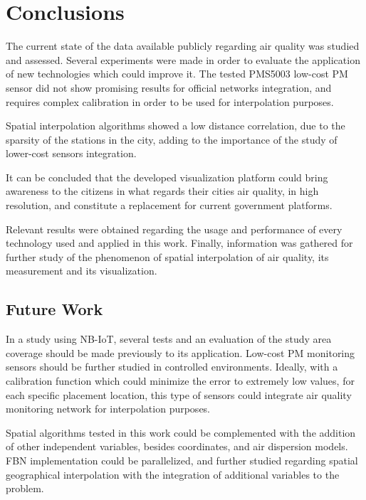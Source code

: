 \section{Conclusions}
\label{sec:concl}

The current state of the data available publicly regarding air quality was studied and assessed. Several experiments were made in order to evaluate the application of new technologies which could improve it. The tested PMS5003 low-cost PM sensor did not show promising results for official networks integration, and requires complex calibration in order to be used for interpolation purposes. 

Spatial interpolation algorithms showed a low distance correlation, due to the sparsity of the stations in the city, adding to the importance of the study of lower-cost sensors integration. 

It can be concluded that the developed visualization platform could bring awareness to the citizens in what regards their cities air quality, in high resolution, and constitute a replacement for current government platforms.

Relevant results were obtained regarding the usage and performance of every technology used and applied in this work. Finally, information was gathered for further study of the phenomenon of spatial interpolation of air quality, its measurement and its visualization.

\subsection{Future Work}

In a study using NB-IoT, several tests and an evaluation of the study area coverage should be made previously to its application. Low-cost PM monitoring sensors should be further studied in controlled environments. Ideally, with a  calibration function which could minimize the error to extremely low values, for each specific placement location, this type of sensors could integrate air quality monitoring network for interpolation purposes.

Spatial algorithms tested in this work could be complemented with the addition of other independent variables, besides coordinates, and air dispersion models. FBN implementation could be parallelized, and further studied regarding spatial geographical interpolation with the integration of additional variables to the problem.